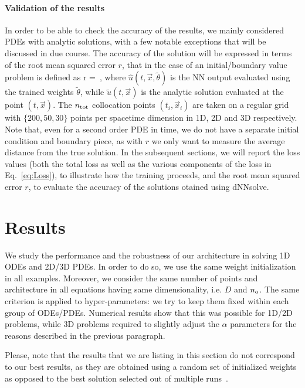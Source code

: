 \documentclass{article}
\begin{document}
\paragraph{Validation of the results} In order to be able to check the accuracy of the results, we mainly considered PDEs with analytic solutions, with a few notable exceptions that will be discussed in due course. The accuracy of the solution will be expressed in terms of the root mean squared error $r$, that in the case of an initial/boundary value problem is defined as
\beq
r = \displaystyle {} \,,
\eeq
where $\hat{u}(t, \vec{x}, \tilde{\theta})$ is the NN output evaluated using the trained weights $\tilde\theta$, while $\tilde{u}(t, \vec{x})$ is the analytic solution evaluated at the point $(t, \vec{x})$. The $n_{\rm tot}$ collocation points $(t_i, \vec{x}_i)$ are taken on a regular grid with $\{200, 50, 30\}$ points per spacetime dimension in 1D, 2D and 3D respectively. Note that, even for a second order PDE in time, we do not have a separate initial condition and boundary piece, as with $r$ we only want to measure the average distance from the true solution. In the subsequent sections, we will report the loss values (both the total loss as well as the various components of the loss in Eq.~\eqref{eq:Loss}), to illustrate how the training proceeds, and the root mean squared error $r$, to evaluate the accuracy of the solutions otained using \textsf{dNNsolve}.



\section{Results}
\label{sec:Results}
We study the performance and the robustness of our architecture in solving 1D ODEs and 2D/3D PDEs. In order to do so, we use the same weight initialization in all examples. Moreover, we consider the same number of points and architecture in all equations having same dimensionality, i.e. $D$ and $n_{\rm o}$. The same criterion is applied to hyper-parameters: we try to keep them fixed within each group of ODEs/PDEs. Numerical results show that this was possible for 1D/2D problems, while 3D problems required to slightly adjust the $\alpha$ parameters for the reasons described in the previous paragraph.

Please, note that the results that we are listing in this section do not correspond to our best results, as they are obtained using a random set of initialized weights as opposed to the best solution selected out of multiple runs~\cite{lu2020deepxde}.
\end{document}
